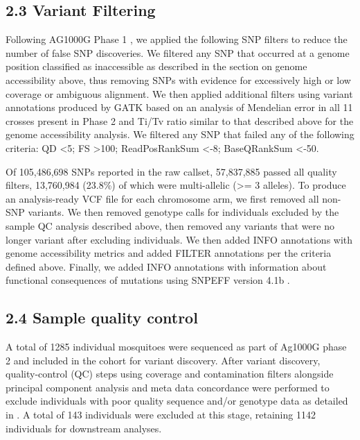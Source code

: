\documentclass[a4paper,11pt,abstracton,hidelinks]{scrartcl}
\begin{document}
\subsection*{2.3 Variant Filtering}
%
Following AG1000G Phase 1 \cite{Ag1000gConsortium2017}, we applied the following SNP filters to reduce the number of false SNP discoveries.
%
We filtered any SNP that occurred at a genome position classified as inaccessible as described in the section on genome accessibility above, thus removing SNPs with evidence for excessively high or low coverage or ambiguous alignment. 
%
We then applied additional filters using variant annotations produced by GATK based on an analysis of Mendelian error in all 11 crosses present in Phase 2 and Ti/Tv ratio similar to that described above for the genome accessibility analysis.
%
We filtered any SNP that failed any of the following criteria: QD <5; FS >100; ReadPosRankSum <-8; BaseQRankSum <-50. 


%
Of 105,486,698 SNPs reported in the raw callset, 57,837,885 passed all quality filters, 13,760,984 (23.8\%) of which were multi-allelic (>= 3 alleles).
%
To produce an analysis-ready VCF file for each chromosome arm, we first removed all non-SNP variants. 
%
We then removed genotype calls for individuals excluded by the sample QC analysis described above, then removed any variants that were no longer variant after excluding individuals. 
%
We then added INFO annotations with genome accessibility metrics and added FILTER annotations per the criteria defined above. 
%
Finally, we added INFO annotations with information about functional consequences of mutations using SNPEFF version 4.1b \cite{Cingolani2012}.


\subsection*{2.4 Sample quality control}
%
A total of 1285 individual mosquitoes were sequenced as part of Ag1000G phase 2 and included in the cohort for variant discovery. 
%
After variant discovery, quality-control (QC) steps using coverage and contamination filters alongside principal component analysis and meta data concordance were performed to exclude individuals with poor quality sequence and/or genotype data as detailed in \cite{Ag1000gConsortium2017}.
%
A total of 143 individuals were excluded at this stage, retaining 1142 individuals for downstream analyses.



\end{document}
